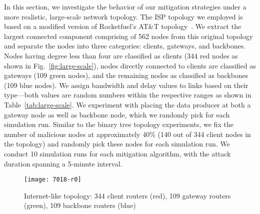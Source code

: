 
In this section, we investigate the behavior of our mitigation strategies under a more realistic, large-scale network topology. The ISP topology we employed is based on a modified version of Rocketfuel's AT\&T topology~\cite{rocketfuel}.
We extract the largest connected component comprising of 562 nodes from this original topology and separate the nodes into three categories: clients, gateways, and backbones. Nodes having degree less than four are classified as clients (344 red nodes as shown in Fig.~\ref{fig:large-scale}), nodes directly connected to clients are classified as gateways (109 green nodes), and the remaining nodes as classified as backbones (109 blue nodes). 
We assign bandwidth and  delay values to links based on their type---both values are random numbers within the respective ranges as shown in Table~\ref{tab:large-scale}. We experiment with placing the data producer at both a gateway node as well as backbone node, which we randomly pick for each simulation run. Similar to the binary tree topology experiments, we fix the number of malicious nodes at approximately 40\% (140 out of 344 client nodes in the topology) and randomly pick these nodes for each simulation run. We conduct 10 simulation runs for each mitigation algorithm, with the attack duration spanning a 5-minute interval.

\begin{figure}[htbp]
  \centering
  \vspace{-.1cm}\texttt{[image: 7018-r0]}
  \vspace{-0.3cm}
  \caption{Internet-like topology: 344 client routers (red), 109 gateway routers (green), 109 backbone routers (blue)}\vspace{-.2cm}
  \label{fig:large-scale-topo}
\end{figure}

